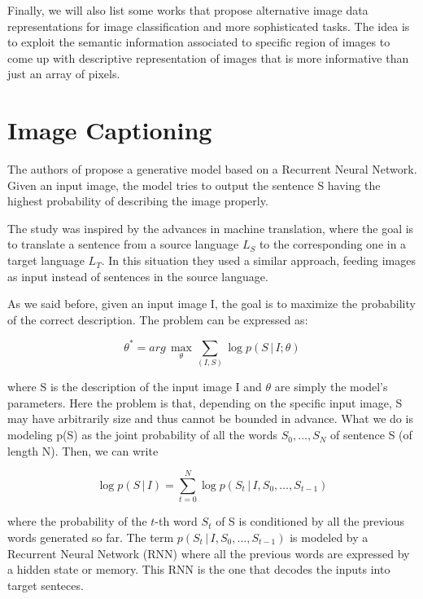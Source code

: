 \documentclass[12pt, twoside, a4paper]{report}
\begin{document}
\bigskip

Finally, we will also list some works that propose alternative image data representations for image classification and more sophisticated tasks. The idea is to exploit the semantic information associated to specific region of images to come up with descriptive representation of images that is more informative than just an array of pixels.

\section{Image Captioning}

The authors of \cite{show-and-tell} propose a generative model based on a Recurrent Neural Network. Given an input image, the model tries to output the sentence S having the highest probability of describing the image properly. 

The study was inspired by the advances in machine translation, where the goal is to translate a sentence from a source language $L_S$ to the corresponding one in a target language $L_T$. 
In this situation they used a similar approach, feeding images as input instead of sentences in the source language.

As we said before, given an input image I, the goal is to maximize the probability of the correct description. The problem can be expressed as:

\begin{equation}
\theta^* = arg\,\max\limits_{\theta} \sum\limits_{(I, S)} \log p(S \, | \, I; \theta) 
\end{equation}

where S is the description of the input image I and $\theta$ are simply the model's parameters. Here the problem is that, depending on the specific input image, S may have arbitrarily size and thus cannot be bounded in advance. What we do is modeling p(S) as the joint probability of all the words $S_0, \dots, S_N$ of sentence S (of length N). Then, we can write 

\begin{equation}
\log p(S \, | \, I)  = \sum\limits_{t=0}^N \log p(S_t \, | \, I, S_0, \dots, S_{t-1}) 
\end{equation}

where the probability of the $t$-th word $S_t$ of S is conditioned by all the previous words generated so far. The term $p(S_t \, | \, I, S_0, \dots, S_{t-1})$ is modeled by a Recurrent Neural Network (RNN) where all the previous words are expressed by a hidden state or memory. This RNN is the one that decodes the inputs into target senteces.
\end{document}
